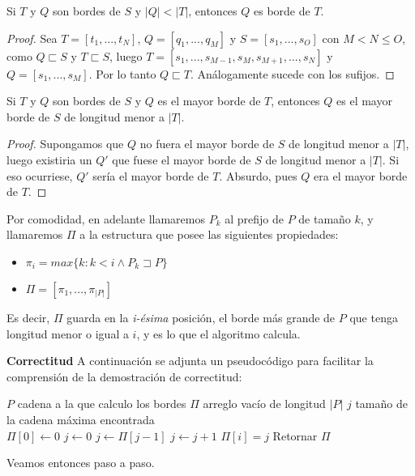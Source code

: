 \begin{lem}
Si $T$ y $Q$ son bordes de $S$ y $|Q|<|T|$, entonces $Q$ es borde de $T$.
\end{lem}
\begin{proof}
Sea $T = [t_1,...,t_N]$, $Q = [q_1,...,q_M]$ y $S = [s_1,...,s_O]$ con $M < N \leq O$, como $Q \sqsubset S$ y $T \sqsubset S$, luego $T = [s_1,..., s_{M-1},s_M,s_{M+1},...,s_N]$ y $Q = [s_1,...,s_M]$. Por lo tanto $Q \sqsubset T$. Análogamente sucede con los sufijos.
\end{proof}

\begin{lem}
Si $T$ y $Q$ son bordes de $S$ y $Q$ es el mayor borde de $T$, entonces $Q$ es el mayor borde de $S$ de longitud menor a $|T|$.
\end{lem}
\begin{proof}
Supongamos que $Q$ no fuera el mayor borde de $S$ de longitud menor a $|T|$, luego existiria un $Q'$ que fuese el mayor borde de $S$ de longitud menor a $|T|$. Si eso ocurriese, $Q'$ sería el mayor borde de $T$. Absurdo, pues $Q$ era el mayor borde de $T$.
\end{proof}

Por comodidad, en adelante llamaremos $P_k$ al prefijo de $P$ de tamaño $k$, y llamaremos $\Pi$ a la estructura que posee las siguientes propiedades:
\begin{itemize}
	\item $\pi_i = max \{k: k < i \wedge P_k \sqsupset P\}$
	\item $\Pi = [\pi_1,...,\pi_{|P|}]$
\end{itemize}
Es decir, $\Pi$ guarda en la \emph{i-ésima} posición, el borde más grande de $P$ que tenga longitud menor o igual a $i$, y es lo que el algoritmo calcula.

\textbf{Correctitud}
A continuación se adjunta un pseudocódigo para facilitar la comprensión de la demostración de correctitud:
\begin{algorithmic}
	\State $P$ cadena a la que calculo los bordes
	\State $\Pi$ arreglo vacío de longitud $|P|$
	\State $j$ tamaño de la cadena máxima encontrada\\
	\State $\Pi[0] \gets 0$
	\State $j \gets 0$
			\State $j \gets \Pi[j-1]$
		\EndWhile
			\State $j \gets j+1$
		\EndIf
		\State $\Pi[i] = j$
	\EndFor
	\State Retornar $\Pi$
\end{algorithmic}

Veamos entonces paso a paso.\\

